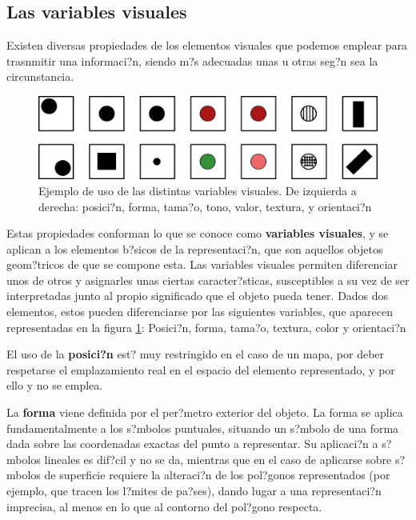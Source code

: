 \subsection{Las variables visuales}

Existen diversas propiedades de los elementos visuales que podemos emplear para trasnmitir una informaci?n, siendo m?s adecuadas unas u otras seg?n sea la circunstancia.

\begin{figure}[!hbt]
\centering
\includegraphics[width=\columnwidth]{../es/Visualizacion/VariablesVisuales.pdf}
\caption{\small Ejemplo de uso de las distintas variables visuales. De izquierda a derecha: posici?n, forma, tama?o, tono, valor, textura, y orientaci?n}
\label{Fig:VariablesVisuales} 
\end{figure}


Estas propiedades conforman lo que se conoce como \textbf{variables visuales}, y se aplican a los elementos b?sicos de la representaci?n, que son aquellos objetos geom?tricos de que se compone esta. Las variables visuales permiten diferenciar unos de otros y asignarles unas ciertas caracter?sticas, susceptibles a su vez de ser interpretadas junto al propio significado que el objeto pueda tener. Dados dos elementos, estos pueden diferenciarse por las siguientes variables, que aparecen representadas en la figura \ref{Fig:VariablesVisuales}: Posici?n, forma, tama?o, textura, color y orientaci?n

El uso de la \textbf{posici?n} est? muy restringido en el caso de un mapa, por deber respetarse el emplazamiento real en el espacio del elemento representado, y por ello y no se emplea.

La \textbf{forma} viene definida por el per?metro exterior del objeto. La forma se aplica fundamentalmente a los s?mbolos puntuales, situando un s?mbolo de una forma dada sobre las coordenadas exactas del punto a representar. Su aplicaci?n a s?mbolos lineales es dif?cil y no se da, mientras que en el caso de aplicarse sobre s?mbolos de superficie requiere la alteraci?n de los pol?gonos representados (por ejemplo, que tracen los l?mites de pa?ses), dando lugar a una representaci?n imprecisa, al menos en lo que al contorno del pol?gono respecta. 

